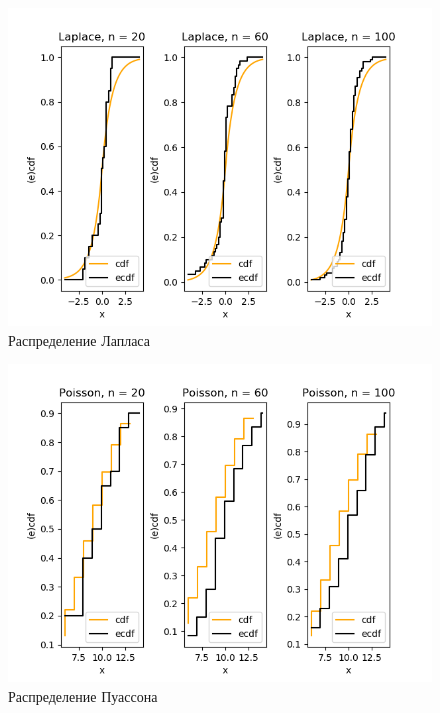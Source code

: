 \documentclass[../body.tex]{subfiles}
\begin{document}
\begin{figure}[H]
	\centering
	\includegraphics[width=\textwidth, height =0.4\textheight]{img/LaplaceCDF.png}
	\caption{Распределение Лапласа}
	\label{fig:laplace_cdf}
\end{figure}


\begin{figure}[H]
	\centering
	\includegraphics[width=\textwidth, height =0.4\textheight]{img/PoissonCDF.png}
	\caption{Распределение Пуассона}
	\label{fig:poisson_cdf}
\end{figure}
\end{document}
